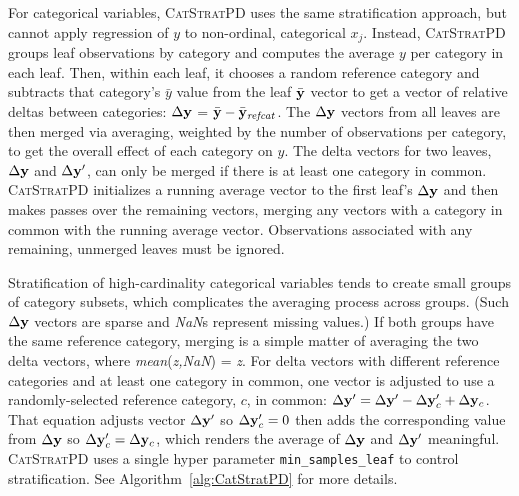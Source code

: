 \documentclass[smallextended]{svjour3}       %
\newcommand{\algref}[1]{Algorithm~\ref{#1}}
\newcommand{\cspd}{\fontfamily{cmr}\textsc{\small CatStratPD}}
\begin{document}
For categorical variables, \cspd{} uses the same stratification approach, but cannot apply  regression of $y$ to non-ordinal, categorical $x_j$. Instead, \cspd{} groups leaf observations by category and computes the average $y$ per category in each leaf. Then,  within each leaf, it chooses a random reference category and subtracts that category's $\bar{y}$ value from the leaf $\bar{\bf y}$ vector to get a vector of relative deltas between categories: $\Delta {\bf y}$ = $\bar{\bf y} - \bar{\bf y}_{\it refcat}$. The $\Delta  {\bf y}$ vectors from all leaves are then merged via averaging, weighted by the number of observations per category, to get the overall effect of each category on $y$.  The delta vectors for two leaves, $\Delta {\bf y}$ and $\Delta {\bf y}'$, can only be merged if there is at least one category in common.  \cspd{} initializes a running average vector to the first leaf's $\Delta  {\bf y}$ and then makes  passes over the remaining vectors, merging any vectors with a category in common with the running average vector.  Observations associated with any remaining, unmerged leaves must be ignored.

Stratification of high-cardinality categorical variables tends to create small groups of category subsets, which complicates the averaging process across groups. (Such $\Delta {\bf y}$ vectors are sparse and {\it NaN}s represent missing values.) If both groups have the same reference category, merging is a simple matter of averaging the two delta vectors, where {\it mean}({\it z,NaN}) = {\it z}.  For delta vectors with different reference categories and at least one category in common, one vector is adjusted to use a randomly-selected reference category, $c$, in common: $\Delta {\bf y}' = \Delta {\bf y}' - \Delta {\bf y}_c' + \Delta {\bf y}_c$. That equation adjusts vector $\Delta {\bf y}'$ so $\Delta {\bf y}_c'=0$ then adds the corresponding value from $\Delta {\bf y}$ so $\Delta {\bf y}_c' = \Delta {\bf y}_c$, which renders the average of $\Delta {\bf y}$ and $\Delta {\bf y}'$ meaningful.  \cspd{} uses a single hyper parameter {\tt\small min\_samples\_leaf} to control stratification. See \algref{alg:CatStratPD} for more details.
\end{document}
